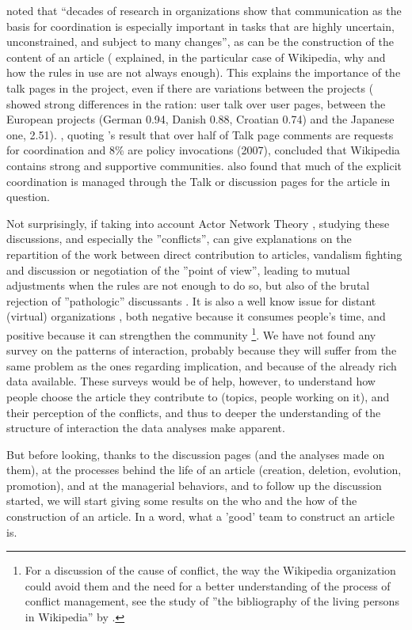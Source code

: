\citet[p. 18]{KitturKraut08} noted that \textquotedblleft decades
of research in organizations show that communication as the basis
for coordination is especially important in tasks that are highly
uncertain, unconstrained, and subject to many changes\textquotedblright ,
as can be the construction of the content of an article (\citet{CardonLevrel09,Cardon12}
explained, in the particular case of Wikipedia, why and how the rules
in use are not always enough). This explains the importance of the
talk pages in the project, even if there are variations between the
projects (\citealp{Voss05} showed strong differences in the ration:
user talk over user pages, between the European projects (German 0.94,
Danish 0.88, Croatian 0.74) and the Japanese one, 2.51). \citet{PancieraHalfakerTerveen09},
quoting \citeauthor{Viegasetal07}'s result that over half of Talk
page comments are requests for coordination and 8\% are policy invocations
(2007), concluded that Wikipedia contains strong and supportive communities.
\citet{Butleretal08} also found that much of the explicit coordination
is managed through the Talk or discussion pages for the article in
question.

Not surprisingly, if taking into account Actor Network Theory \citep{Latour05,AkrichCallonLatour06},
studying these discussions, and especially the ''conflicts'', can
give explanations on the repartition of the work between direct contribution
to articles, vandalism fighting and discussion or negotiation of the
''point of view'', leading to mutual adjustments when the rules
are not enough to do so, but also of the brutal rejection of ''pathologic''
discussants \citep{Aurayetal09}. It is also a well know issue for
distant (virtual) organizations \citep{HindsBailey03,HindsMortensen05},
both negative because it consumes people's time, and positive because
it can strengthen the community \citep{Francoetal95}\footnote{For a discussion of the cause of conflict, the way the Wikipedia organization
could avoid them and the need for a better understanding of the process
of conflict management, see the study of ''the bibliography of the
living persons in Wikipedia'' by \citet{JoyceButlerPike11}.}. We have not found any survey on the patterns of interaction, probably
because they will suffer from the same problem as the ones regarding
implication, and because of the already rich data available. These
surveys would be of help, however, to understand how people choose
the article they contribute to (topics, people working on it), and
their perception of the conflicts, and thus to deeper the understanding
of the structure of interaction the data analyses make apparent.

But before looking, thanks to the discussion pages (and the analyses
made on them), at the processes behind the life of an article (creation,
deletion, evolution, promotion), and at the managerial behaviors,
and to follow up the discussion started, we will start giving some
results on the who and the how of the construction of an article.
In a word, what a 'good' team to construct an article is.
